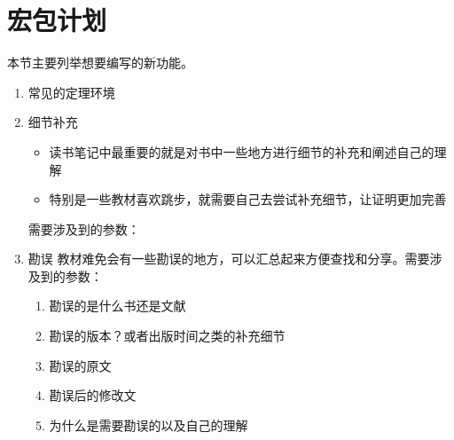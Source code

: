 \documentclass{xdyy-usermanual}
\begin{document}
\maketitle
\tableofcontents


\section{宏包计划}

本节主要列举想要编写的新功能。

\begin{enumerate}
  \item 常见的定理环境
  \item 细节补充
    \begin{itemize}
      \item 读书笔记中最重要的就是对书中一些地方进行细节的补充和阐述自己的理解
      \item 特别是一些教材喜欢跳步，就需要自己去尝试补充细节，让证明更加完善
    \end{itemize}
    需要涉及到的参数：
  \item 勘误
    教材难免会有一些勘误的地方，可以汇总起来方便查找和分享。需要涉及到的参数：
      \begin{enumerate}
        \item 勘误的是什么书还是文献
        \item 勘误的版本？或者出版时间之类的补充细节
        \item 勘误的原文
        \item 勘误后的修改文
        \item 为什么是需要勘误的以及自己的理解
      \end{enumerate}
\end{enumerate}
\end{document}
